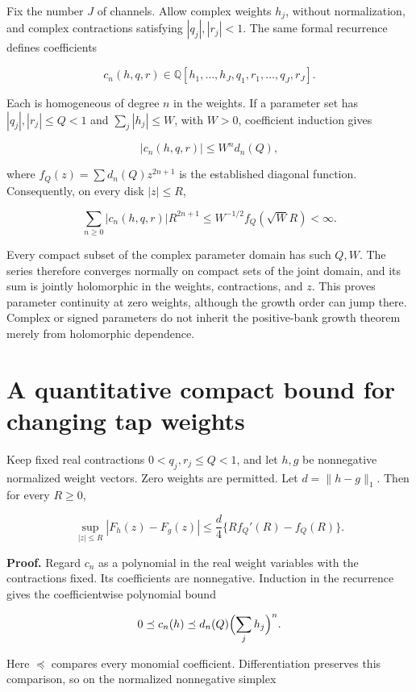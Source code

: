Fix the number \(J\) of channels. Allow complex weights \(h_j\), without
normalization, and complex contractions satisfying \(|q_j|,|r_j|<1\).
The same formal recurrence defines coefficients

\[
c_n(h,q,r)\in\mathbb Q[h_1,\ldots,h_J,q_1,r_1,\ldots,q_J,r_J].
\]

Each is homogeneous of degree \(n\) in the weights. If a parameter set
has \(|q_j|,|r_j|\le Q<1\) and \(\sum_j|h_j|\le W\), with \(W>0\),
coefficient induction gives

\[
|c_n(h,q,r)|\le W^n d_n(Q),
\]

where \(f_Q(z)=\sum d_n(Q)z^{2n+1}\) is the established diagonal
function. Consequently, on every disk \(|z|\le R\),

\[
\sum_{n\ge0}|c_n(h,q,r)|R^{2n+1}
\le W^{-1/2}f_Q(\sqrt W R)<\infty.
\]

Every compact subset of the complex parameter domain has such \(Q,W\).
The series therefore converges normally on compact sets of the joint
domain, and its sum is jointly holomorphic in the weights, contractions,
and \(z\). This proves parameter continuity at zero weights, although
the growth order can jump there. Complex or signed parameters do not
inherit the positive-bank growth theorem merely from holomorphic
dependence.

\hypertarget{a-quantitative-compact-bound-for-changing-tap-weights}{%
\section{A quantitative compact bound for changing tap
weights}\label{a-quantitative-compact-bound-for-changing-tap-weights}}

Keep fixed real contractions \(0<q_j,r_j\le Q<1\), and let \(h,g\) be
nonnegative normalized weight vectors. Zero weights are permitted. Let
\(d=\|h-g\|_1\). Then for every \(R\ge0\),

\[
\boxed{\sup_{|z|\le R}|F_h(z)-F_g(z)|
\le\frac d4\{R f_Q'(R)-f_Q(R)\}.}
\]

\textbf{Proof.} Regard \(c_n\) as a polynomial in the real weight
variables with the contractions fixed. Its coefficients are nonnegative.
Induction in the recurrence gives the coefficientwise polynomial bound

\[
0\preceq c_n(h)\preceq d_n(Q)\Bigl(\sum_jh_j\Bigr)^n.
\]

Here \(\preceq\) compares every monomial coefficient. Differentiation
preserves this comparison, so on the normalized nonnegative simplex

